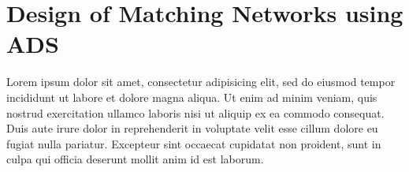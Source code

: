 \documentclass[report.tex]{subfiles}
\begin{document}
\pagebreak \section{Design of Matching Networks using ADS}
Lorem ipsum dolor sit amet, consectetur adipisicing elit, sed do eiusmod tempor incididunt ut labore et dolore magna aliqua. Ut enim ad minim veniam, quis nostrud exercitation ullamco laboris nisi ut aliquip ex ea commodo consequat. Duis aute irure dolor in reprehenderit in voluptate velit esse cillum dolore eu fugiat nulla pariatur. Excepteur sint occaecat cupidatat non proident, sunt in culpa qui officia deserunt mollit anim id est laborum.








\end{document}
